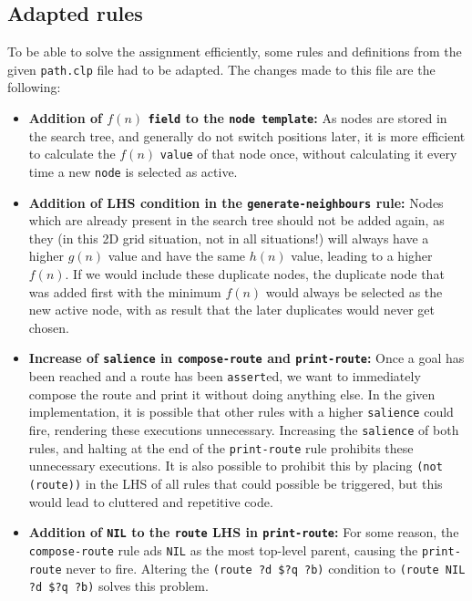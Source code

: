 \documentclass[12pt, a4paper]{article}
\begin{document}
\subsection{Adapted rules}
\label{subsection:adapted-rules}
To be able to solve the assignment efficiently, some rules and definitions from the given \texttt{path.clp} file had to be adapted. The changes made to this file are the following:
\begin{itemize}
\item \textbf{Addition of $f(n)$ \texttt{field} to the \texttt{node template}:} As nodes are stored in the search tree, and generally do not switch positions later, it is more efficient to calculate the $f(n)$ \texttt{value} of that node once, without calculating it every time a new \texttt{node} is selected as active.
\item \textbf{Addition of LHS condition in the \texttt{generate-neighbours} rule:} Nodes which are already present in the search tree should not be added again, as they (in this 2D grid situation, not in all situations!) will always have a higher $g(n)$ value and have the same $h(n)$ value, leading to a higher $f(n)$. If we would include these duplicate nodes, the duplicate node that was added first with the minimum $f(n)$ would always be selected as the new active node, with as result that the later duplicates would never get chosen.
\item \textbf{Increase of \texttt{salience} in \texttt{compose-route} and \texttt{print-route}:} Once a goal has been reached and a route has been \texttt{assert}ed, we want to immediately compose the route and print it without doing anything else. In the given implementation, it is possible that other rules with a higher \texttt{salience} could fire, rendering these executions unnecessary. Increasing the \texttt{salience} of both rules, and halting at the end of the \texttt{print-route} rule prohibits these unnecessary executions. It is also possible to prohibit this by placing \texttt{(not (route))} in the LHS of all rules that could possible be triggered, but this would lead to cluttered and repetitive code.
\item \textbf{Addition of \texttt{NIL} to the \texttt{route} LHS in \texttt{print-route}:} For some reason, the \texttt{compose-route} rule ads \texttt{NIL} as the most top-level parent, causing the \texttt{print-route} never to fire. Altering the \texttt{(route ?d \$?q ?b)} condition to \texttt{(route NIL ?d \$?q ?b)} solves this problem.
\end{itemize}
\end{document}
